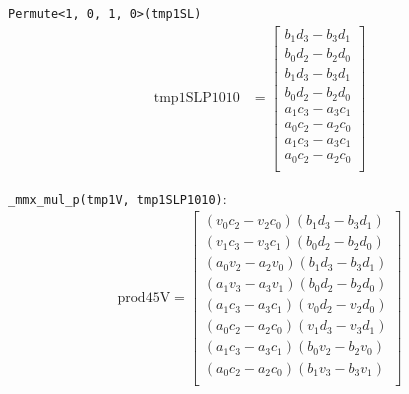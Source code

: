 \documentclass[]{scrartcl}
\newcommand{\pth}[1]{\left(#1\right)}
\begin{document}
\texttt{Permute<1, 0, 1, 0>(tmp1SL)}
\begin{align*}
\mathrm{tmp1SLP1010} 
&=
\begin{bmatrix}
	b_1d_3 - b_3d_1\\
	b_0d_2 - b_2d_0\\
	b_1d_3 - b_3d_1\\
	b_0d_2 - b_2d_0\\
	a_1c_3 - a_3c_1\\	
	a_0c_2 - a_2c_0\\
	a_1c_3 - a_3c_1\\	
	a_0c_2 - a_2c_0\\	
\end{bmatrix}
\end{align*}


\texttt{_mmx_mul_p(tmp1V, tmp1SLP1010)}:
\begin{align*}
\mathrm{prod45V} 
=
\begin{bmatrix}
\pth{v_0c_2 - v_2c_0}\pth{b_1d_3 - b_3d_1}\\
\pth{v_1c_3 - v_3c_1}\pth{b_0d_2 - b_2d_0}\\
\pth{a_0v_2 - a_2v_0}\pth{b_1d_3 - b_3d_1}\\
\pth{a_1v_3 - a_3v_1}\pth{b_0d_2 - b_2d_0}\\
\pth{a_1c_3 - a_3c_1}\pth{v_0d_2 - v_2d_0}\\
\pth{a_0c_2 - a_2c_0}\pth{v_1d_3 - v_3d_1}\\
\pth{a_1c_3 - a_3c_1}\pth{b_0v_2 - b_2v_0}\\
\pth{a_0c_2 - a_2c_0}\pth{b_1v_3 - b_3v_1}\\
\end{bmatrix}
\end{align*}
\end{document}
